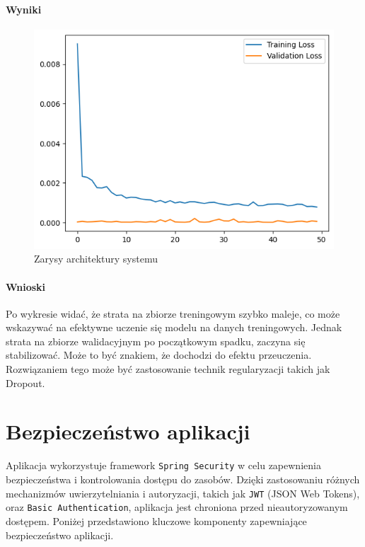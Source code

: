 \paragraph{Wyniki}

\begin{figure}[htb]
    \centering
    \includegraphics[width=0.9\linewidth]{Wyniki_testowe_i_walidacyjne.png}
    \caption{Zarysy architektury systemu}
    \label{fig:Wyniki_testowe_i_walidacyjne}
\end{figure}

\paragraph{Wnioski}
Po wykresie widać, że strata na zbiorze treningowym szybko maleje, co może wskazywać na efektywne uczenie się modelu na danych treningowych. Jednak strata na zbiorze walidacyjnym po początkowym spadku, zaczyna się stabilizować. Może to być znakiem, że dochodzi do efektu przeuczenia. Rozwiązaniem tego może być zastosowanie technik regularyzacji takich jak Dropout.

\section{Bezpieczeństwo aplikacji}

Aplikacja wykorzystuje framework \texttt{Spring Security} w celu zapewnienia bezpieczeństwa i kontrolowania dostępu do zasobów. Dzięki zastosowaniu różnych mechanizmów uwierzytelniania i autoryzacji, takich jak \texttt{JWT} (JSON Web Tokens), oraz \texttt{Basic Authentication}, aplikacja jest chroniona przed nieautoryzowanym dostępem. Poniżej przedstawiono kluczowe komponenty zapewniające bezpieczeństwo aplikacji.

